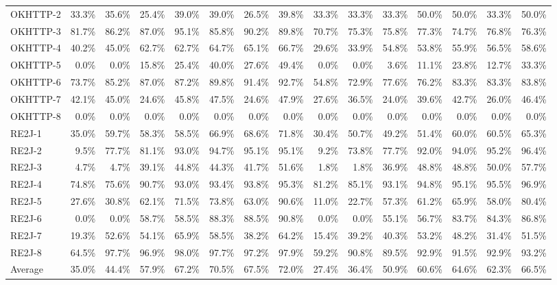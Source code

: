 \begin{tabular}{ l rrrrrrr rrrrrrr}
OKHTTP-2 &  33.3\% &  35.6\% &  25.4\% &  39.0\% &  39.0\% &  26.5\% &  39.8\% &  33.3\% &  33.3\% &  33.3\% &  50.0\% &  50.0\% &  33.3\% &  50.0\%\\ 
OKHTTP-3 &  81.7\% &  86.2\% &  87.0\% &  95.1\% &  85.8\% &  90.2\% &  89.8\% &  70.7\% &  75.3\% &  75.8\% &  77.3\% &  74.7\% &  76.8\% &  76.3\%\\ 
OKHTTP-4 &  40.2\% &  45.0\% &  62.7\% &  62.7\% &  64.7\% &  65.1\% &  66.7\% &  29.6\% &  33.9\% &  54.8\% &  53.8\% &  55.9\% &  56.5\% &  58.6\%\\ 
OKHTTP-5 &  0.0\% &  0.0\% &  15.8\% &  25.4\% &  40.0\% &  27.6\% &  49.4\% &  0.0\% &  0.0\% &  3.6\% &  11.1\% &  23.8\% &  12.7\% &  33.3\%\\ 
OKHTTP-6 &  73.7\% &  85.2\% &  87.0\% &  87.2\% &  89.8\% &  91.4\% &  92.7\% &  54.8\% &  72.9\% &  77.6\% &  76.2\% &  83.3\% &  83.3\% &  83.8\%\\ 
OKHTTP-7 &  42.1\% &  45.0\% &  24.6\% &  45.8\% &  47.5\% &  24.6\% &  47.9\% &  27.6\% &  36.5\% &  24.0\% &  39.6\% &  42.7\% &  26.0\% &  46.4\%\\ 
OKHTTP-8 &  0.0\% &  0.0\% &  0.0\% &  0.0\% &  0.0\% &  0.0\% &  0.0\% &  0.0\% &  0.0\% &  0.0\% &  0.0\% &  0.0\% &  0.0\% &  0.0\%\\ 
RE2J-1 &  35.0\% &  59.7\% &  58.3\% &  58.5\% &  66.9\% &  68.6\% &  71.8\% &  30.4\% &  50.7\% &  49.2\% &  51.4\% &  60.0\% &  60.5\% &  65.3\%\\ 
RE2J-2 &  9.5\% &  77.7\% &  81.1\% &  93.0\% &  94.7\% &  95.1\% &  95.1\% &  9.2\% &  73.8\% &  77.7\% &  92.0\% &  94.0\% &  95.2\% &  96.4\%\\ 
RE2J-3 &  4.7\% &  4.7\% &  39.1\% &  44.8\% &  44.3\% &  41.7\% &  51.6\% &  1.8\% &  1.8\% &  36.9\% &  48.8\% &  48.8\% &  50.0\% &  57.7\%\\ 
RE2J-4 &  74.8\% &  75.6\% &  90.7\% &  93.0\% &  93.4\% &  93.8\% &  95.3\% &  81.2\% &  85.1\% &  93.1\% &  94.8\% &  95.1\% &  95.5\% &  96.9\%\\ 
RE2J-5 &  27.6\% &  30.8\% &  62.1\% &  71.5\% &  73.8\% &  63.0\% &  90.6\% &  11.0\% &  22.7\% &  57.3\% &  61.2\% &  65.9\% &  58.0\% &  80.4\%\\ 
RE2J-6 &  0.0\% &  0.0\% &  58.7\% &  58.5\% &  88.3\% &  88.5\% &  90.8\% &  0.0\% &  0.0\% &  55.1\% &  56.7\% &  83.7\% &  84.3\% &  86.8\%\\ 
RE2J-7 &  19.3\% &  52.6\% &  54.1\% &  65.9\% &  58.5\% &  38.2\% &  64.2\% &  15.4\% &  39.2\% &  40.3\% &  53.2\% &  48.2\% &  31.4\% &  51.5\%\\ 
RE2J-8 &  64.5\% &  97.7\% &  96.9\% &  98.0\% &  97.7\% &  97.2\% &  97.9\% &  59.2\% &  90.8\% &  89.5\% &  92.9\% &  91.5\% &  92.9\% &  93.2\%\\ 
\midrule 
Average  &  35.0\% &  44.4\% &  57.9\% &  67.2\% &  70.5\% &  67.5\% &  72.0\% &  27.4\% &  36.4\% &  50.9\% &  60.6\% &  64.6\% &  62.3\% &  66.5\%\\ 
\bottomrule 
\end{tabular} 
